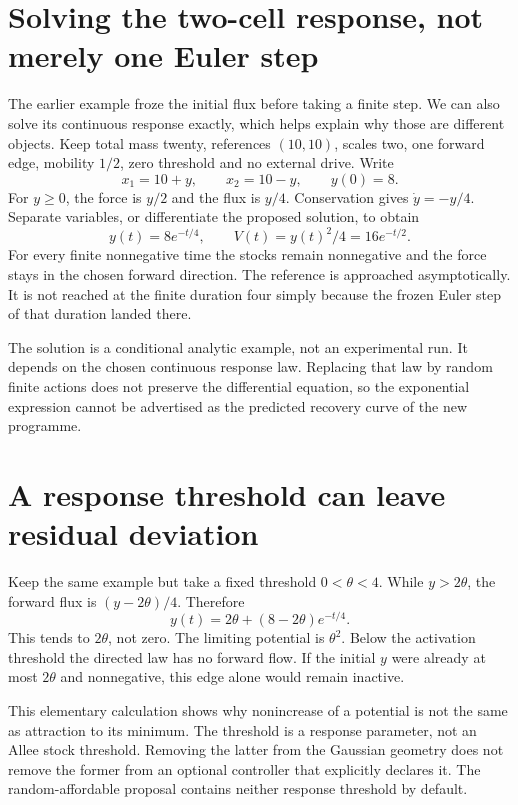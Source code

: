 \section{Solving the two-cell response, not merely one Euler step}
The earlier example froze the initial flux before taking a finite step.
We can also solve its continuous response exactly, which helps explain
why those are different objects. Keep total mass twenty, references
$(10,10)$, scales two, one forward edge, mobility $1/2$, zero threshold
and no external drive. Write
\begin{equation}
 x_1=10+y,\qquad x_2=10-y,\qquad y(0)=8.
\end{equation}
For $y\geq0$, the force is $y/2$ and the flux is $y/4$.
Conservation gives $\dot y=-y/4$. Separate variables, or differentiate
the proposed solution, to obtain
\begin{equation}
 y(t)=8e^{-t/4},\qquad V(t)=y(t)^2/4=16e^{-t/2}.
\end{equation}
For every finite nonnegative time the stocks remain nonnegative and the
force stays in the chosen forward direction. The reference is approached
asymptotically. It is not reached at the finite duration four simply
because the frozen Euler step of that duration landed there.

The solution is a conditional analytic example, not an experimental run.
It depends on the chosen continuous response law. Replacing that law by
random finite actions does not preserve the differential equation, so the
exponential expression cannot be advertised as the predicted recovery
curve of the new programme.

\section{A response threshold can leave residual deviation}
Keep the same example but take a fixed threshold $0<\theta<4$.
While $y>2\theta$, the forward flux is
$(y-2\theta)/4$. Therefore
\begin{equation}
 y(t)=2\theta+(8-2\theta)e^{-t/4}.
\end{equation}
This tends to $2\theta$, not zero. The limiting potential is
$\theta^2$. Below the activation threshold the directed law has no
forward flow. If the initial $y$ were already at most $2\theta$ and
nonnegative, this edge alone would remain inactive.

This elementary calculation shows why nonincrease of a potential is not
the same as attraction to its minimum. The threshold is a response
parameter, not an Allee stock threshold. Removing the latter from the
Gaussian geometry does not remove the former from an optional controller
that explicitly declares it. The random-affordable proposal contains
neither response threshold by default.

